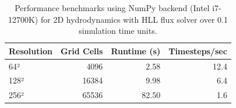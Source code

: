 \begin{table}[h]
\centering
\caption{Performance benchmarks using NumPy backend (Intel i7-12700K) for 2D hydrodynamics with HLL flux solver over 0.1 simulation time units.}
\label{tab:performance}
\begin{tabular}{lrrr}
\hline
Resolution & Grid Cells & Runtime (s) & Timesteps/sec \\
\hline
64² & 4096 & 2.58 & 12.4 \\
128² & 16384 & 9.98 & 6.4 \\
256² & 65536 & 82.50 & 1.6 \\
\hline
\end{tabular}
\end{table}
